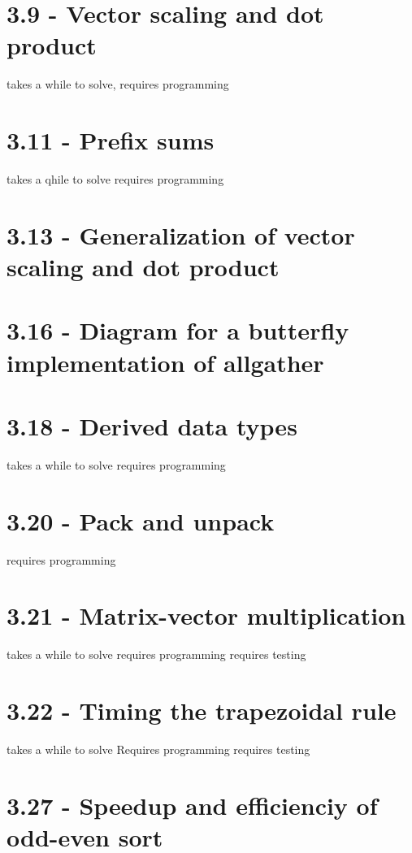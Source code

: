 \documentclass[a4paper,11pt,twoside]{article}
\begin{document}
\section{3.9 - Vector scaling and dot product}



takes a while to solve,
requires programming

\section{3.11 - Prefix sums}
takes a qhile to solve
requires programming

\section{3.13 - Generalization of vector scaling and dot product}




\section{3.16 - Diagram for a butterfly implementation of allgather}

\section{3.18 - Derived data types}
takes a while to solve
requires programming

\section{3.20 - Pack and unpack}
requires programming


\section{3.21 - Matrix-vector multiplication}
takes a while to solve
requires programming
requires testing

\section{3.22 - Timing the trapezoidal rule}
takes a while to solve
Requires programming
requires testing

\section{3.27 - Speedup and efficienciy of odd-even sort}



\end{document}
